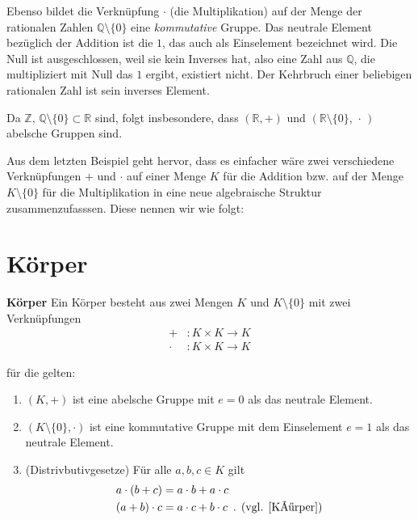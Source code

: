 \theoremstyle{example}
\begin{example}{}
Ebenso bildet die Verknüpfung $\cdot$ (die Multiplikation) auf der Menge der rationalen Zahlen $\mathbb{Q}\setminus\{0\}$  eine \emph{kommutative} Gruppe. Das neutrale Element bezüglich der Addition ist die $1$, das auch als {\glqq}Einselement{\grqq} \cite[S.  20, 4.1]{Skript} bezeichnet wird. Die Null ist ausgeschlossen, weil sie kein Inverses hat, also eine Zahl aus $\mathbb{Q}$, die multipliziert mit Null das $1$ ergibt, existiert nicht. Der Kehrbruch einer beliebigen rationalen Zahl ist sein inverses Element.
\end{example}

\theoremstyle{example}
\begin{example}{}
Da $\mathbb{Z}, \, \mathbb{Q}\setminus\{0\} \subset \mathbb{R}$ sind, folgt insbesondere, dass $(\mathbb{R},+)$ und $(\mathbb{R}\setminus\{0\}, \, \cdot \,)$ abelsche Gruppen sind. 
\end{example}

Aus dem letzten Beispiel geht hervor, dass es einfacher wäre zwei verschiedene Verknüpfungen  $+$ und $\cdot$ auf einer Menge $K$ für die Addition bzw. auf der Menge $K\setminus\{0\}$ für die Multiplikation in eine  neue algebraische Struktur zusammenzufasssen. Diese nennen wir wie folgt:

\section{Körper}
\label{sec:Körper}
\theoremstyle{defintion}
\begin{definition}{\textbf{Körper}}
Ein Körper besteht aus zwei Mengen $K$ und $K\setminus\{0\}$ mit zwei Verknüpfungen
\begin{align*}
	+&: K \times K \rightarrow K
	\\ \cdot &: K \times K \rightarrow K
\end{align*}

für die gelten:
\begin{enumerate}
\item $(K,+)$ ist eine abelsche Gruppe mit $e=0$ als das neutrale Element.
\item $(K\setminus\{0\}, \cdot)$ ist eine kommutative Gruppe mit dem Einselement $e=1$ als das neutrale Element.
\item(Distrivbutivgesetze)
Für alle $a, b, c \in K$ gilt
\begin{align*}
a \cdot (b+c)  &= a \cdot b + a \cdot c
\\ (a+b) \cdot c &= a\cdot c + b \cdot c \text{\, . (vgl. \cite{Körper})}
\end{align*}
\end{enumerate}
\end{definition}

